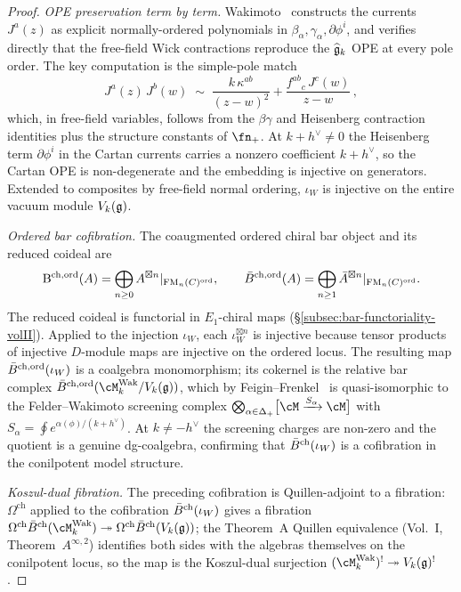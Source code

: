 \begin{proof}
\emph{OPE preservation term by term.}
Wakimoto~\cite{Wakimoto86} constructs the currents $J^a(z)$
as explicit normally-ordered polynomials in
$\beta_\alpha, \gamma_\alpha, \partial\phi^i$, and verifies
directly that the free-field Wick contractions reproduce the
$\widehat{\mathfrak{g}}_k$ OPE at every pole order. The key
computation is the simple-pole match
\[
J^a(z)\,J^b(w) \;\sim\;
 \frac{k\,\kappa^{ab}}{(z-w)^2}
 + \frac{f^{ab}{}_c\,J^c(w)}{z-w}\,,
\]
which, in free-field variables, follows from the
$\beta\gamma$ and Heisenberg contraction identities plus the
structure constants of $\fn_+$. At $k+h^\vee \neq 0$ the
Heisenberg term $\partial\phi^i$ in the Cartan currents carries
a nonzero coefficient $k+h^\vee$, so the Cartan OPE is
non-degenerate and the embedding is injective on generators.
Extended to composites by free-field normal ordering, $\iota_W$
is injective on the entire vacuum module
$V_k(\mathfrak{g})$.

\emph{Ordered bar cofibration.}
The coaugmented ordered chiral bar object and its reduced coideal are
\[
\mathrm B^{\mathrm{ch,ord}}(A)
=\bigoplus_{n\ge0}
A^{\boxtimes n}|_{\mathrm{FM}_n(C)^{\mathrm{ord}}},
\qquad
\bar{B}^{\mathrm{ch,ord}}(A)
=\bigoplus_{n\ge1}
\bar A^{\boxtimes n}|_{\mathrm{FM}_n(C)^{\mathrm{ord}}}.
\]
The reduced coideal is functorial in $E_1$-chiral maps
(\S\ref{subsec:bar-functoriality-volII}). Applied to the
injection $\iota_W$, each $\iota_W^{\boxtimes n}$ is injective
because tensor products of injective $D$-module maps are
injective on the ordered locus. The resulting map
$\bar{B}^{\mathrm{ch,ord}}(\iota_W)$ is a coalgebra monomorphism; its cokernel
is the relative bar complex
$\barB^{\mathrm{ch,ord}}(\cM_k^{\mathrm{Wak}} / V_k(\fg))$, which by
Feigin--Frenkel~\cite{FF92} is quasi-isomorphic to the
Felder--Wakimoto screening complex
$\bigotimes_{\alpha \in \Delta_+} \bigl[\cM \xrightarrow{S_\alpha}
\cM\bigr]$ with $S_\alpha = \oint e^{\alpha(\phi)/(k+h^\vee)}$.
At $k \neq -h^\vee$ the screening charges are non-zero and
the quotient is a genuine dg-coalgebra, confirming that
$\bar{B}^{\mathrm{ch}}(\iota_W)$ is a cofibration in the conilpotent model
structure.

\emph{Koszul-dual fibration.}
The preceding cofibration is Quillen-adjoint to a fibration:
$\Omega^{\mathrm{ch}}$ applied to
the cofibration $\bar{B}^{\mathrm{ch}}(\iota_W)$ gives a fibration
$\Omega^{\mathrm{ch}}\barBch(\cM_k^{\mathrm{Wak}})
\twoheadrightarrow \Omega^{\mathrm{ch}}\barBch(V_k(\fg))$;
the Theorem~A Quillen equivalence
(Vol.~I, Theorem~\(A^{\infty,2}\)) identifies both sides with
the algebras themselves on the conilpotent locus, so the map
is the Koszul-dual surjection
$(\cM_k^{\mathrm{Wak}})^! \twoheadrightarrow V_k(\fg)^!$.


\end{proof}
